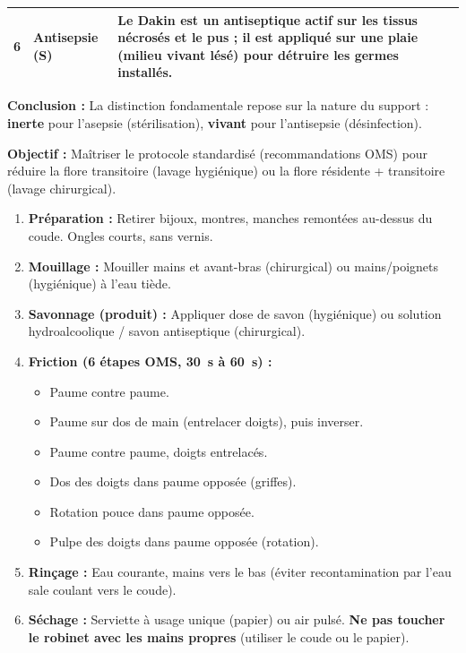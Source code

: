 \documentclass[11pt]{article}
\begin{document}
\begin{exoresolu}
\begin{center}
\begin{tabularx}{\linewidth}{|c|X|X|}
    6 & \textbf{Antisepsie (S)} & Le Dakin est un antiseptique actif sur les tissus nécrosés et le pus ; il est appliqué sur une \textbf{plaie (milieu vivant lésé)} pour détruire les germes installés. \\ \hline
    \end{tabularx}
    \end{center}
    \textbf{Conclusion :} La distinction fondamentale repose sur la nature du support : \textbf{inerte} pour l'asepsie (stérilisation), \textbf{vivant} pour l'antisepsie (désinfection).
\end{exoresolu}

\begin{methode}
    \textbf{Objectif :} Maîtriser le protocole standardisé (recommandations OMS) pour réduire la flore transitoire (lavage hygiénique) ou la flore résidente + transitoire (lavage chirurgical).
    \begin{enumerate}
        \item \textbf{Préparation :} Retirer bijoux, montres, manches remontées au-dessus du coude. Ongles courts, sans vernis.
        \item \textbf{Mouillage :} Mouiller mains et avant-bras (chirurgical) ou mains/poignets (hygiénique) à l'eau tiède.
        \item \textbf{Savonnage (produit) :} Appliquer dose de savon (hygiénique) ou solution hydroalcoolique / savon antiseptique (chirurgical).
        \item \textbf{Friction (6 étapes OMS, \SI{30}{\second} à \SI{60}{\second}) :}
            \begin{itemize}
                \item Paume contre paume.
                \item Paume sur dos de main (entrelacer doigts), puis inverser.
                \item Paume contre paume, doigts entrelacés.
                \item Dos des doigts dans paume opposée (griffes).
                \item Rotation pouce dans paume opposée.
                \item Pulpe des doigts dans paume opposée (rotation).
            \end{itemize}
        \item \textbf{Rinçage :} Eau courante, mains vers le bas (éviter recontamination par l'eau sale coulant vers le coude).
        \item \textbf{Séchage :} Serviette à usage unique (papier) ou air pulsé. \textbf{Ne pas toucher le robinet avec les mains propres} (utiliser le coude ou le papier).

\end{enumerate}
\end{methode}
\end{document}
